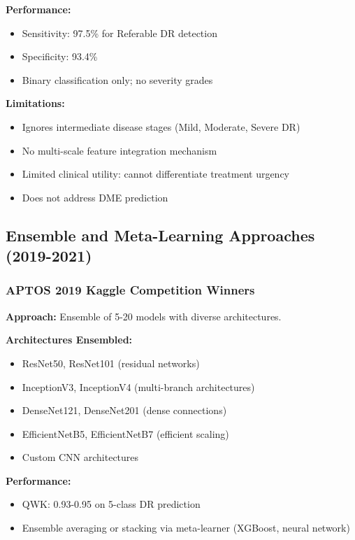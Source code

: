 \documentclass[12pt,a4paper]{article}
\begin{document}
\textbf{Performance:}
\begin{itemize}
    \item Sensitivity: 97.5\% for Referable DR detection
    \item Specificity: 93.4\%
    \item Binary classification only; no severity grades
\end{itemize}

\textbf{Limitations:}
\begin{itemize}
    \item Ignores intermediate disease stages (Mild, Moderate, Severe DR)
    \item No multi-scale feature integration mechanism
    \item Limited clinical utility: cannot differentiate treatment urgency
    \item Does not address DME prediction
\end{itemize}

\subsection{Ensemble and Meta-Learning Approaches (2019-2021)}

\subsubsection{APTOS 2019 Kaggle Competition Winners}

\textbf{Approach:} Ensemble of 5-20 models with diverse architectures.

\textbf{Architectures Ensembled:}
\begin{itemize}
    \item ResNet50, ResNet101 (residual networks)
    \item InceptionV3, InceptionV4 (multi-branch architectures)
    \item DenseNet121, DenseNet201 (dense connections)
    \item EfficientNetB5, EfficientNetB7 (efficient scaling)
    \item Custom CNN architectures
\end{itemize}

\textbf{Performance:}
\begin{itemize}
    \item QWK: 0.93-0.95 on 5-class DR prediction
    \item Ensemble averaging or stacking via meta-learner (XGBoost, neural network)
\end{itemize}
\end{document}

